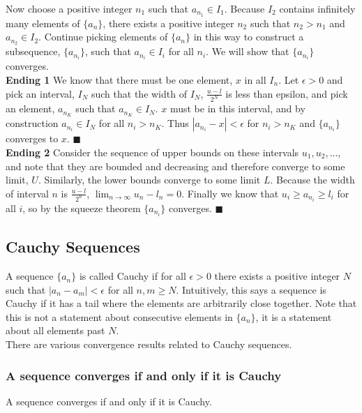 \documentclass[12pt]{article}
\begin{document}
    Now choose a positive integer $n_1$ such that $a_{n_1} \in I_1$. Because $I_2$ contains infinitely many elements 
    of $\{a_n\}$, there exists a positive integer $n_2$ such that $n_2 > n_1$ and $a_{n_2} \in I_2$. Continue picking
    elements of $\{a_n\}$ in this way to construct a subsequence, $\{a_{n_i}\}$, such that $a_{n_i} \in I_i$ for all $n_i$.
    We will show that $\{a_{n_i}\}$ converges.\\
    
    \textbf{Ending 1} We know that there must be one element, $x$ in all $I_n$. Let $\epsilon > 0$ and pick
    an interval, $I_N$ such that the width of $I_N$, $\frac{u - l}{2^N}$ is less than epsilon, and pick an 
    element, $a_{n_K}$ such that $a_{n_K} \in I_N$. $x$ must be in this interval, and by construction 
    $a_{n_i} \in I_N$ for all $n_i > n_K$. Thus $|a_{n_i} - x| < \epsilon$ for $n_i > n_K$ and $\{a_{n_i}\}$
    converges to $x$. $\blacksquare$\\

    \textbf{Ending 2} Consider the sequence of upper bounds on these intervals $u_1, u_2, ... $, and note that
    they are bounded and decreasing and therefore converge to some limit, $U$. Similarly, the lower bounds
    converge to some limit $L$. Because the width of interval $n$ is $\frac{u-l}{2^n}$, $\lim_{n \to \infty} u_n - l_n = 0$.
    Finally we know that $u_i \geq a_{n_i} \geq l_i$ for all $i$, so by the squeeze theorem $\{a_{n_i}\}$ converges. 
     $\blacksquare$
  \subsection{Cauchy Sequences}
    A sequence $\{a_n\}$ is called Cauchy if for all $\epsilon > 0$ there exists a positive integer $N$ such 
    that $|a_n - a_m| < \epsilon$ for all $n, m \geq N$. Intuitively, this says a sequence is Cauchy if it
    has a tail where the elements are arbitrarily close together. Note that this is not a statement about
    consecutive elements in $\{a_n\}$, it is a statement about all elements past $N$.\\

    There are various convergence results related to Cauchy sequences.
    \subsubsection{A sequence converges if and only if it is Cauchy}
    \thm A sequence converges if and only if it is Cauchy.\\
\end{document}
